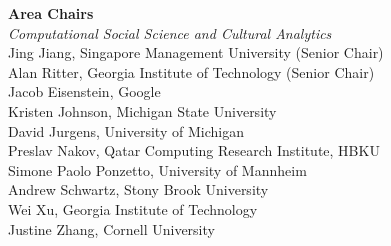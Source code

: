 {\bf Area Chairs} \\
\emph{Computational Social Science and Cultural Analytics} \\
\hspace*{0.2in} Jing Jiang, Singapore Management University (Senior Chair)\\
\hspace*{0.2in} Alan Ritter, Georgia Institute of Technology (Senior Chair)\\
\hspace*{0.2in} Jacob Eisenstein, Google\\
\hspace*{0.2in} Kristen Johnson, Michigan State University\\
\hspace*{0.2in} David Jurgens, University of Michigan\\
\hspace*{0.2in} Preslav Nakov, Qatar Computing Research Institute, HBKU\\
\hspace*{0.2in} Simone Paolo Ponzetto, University of Mannheim\\
\hspace*{0.2in} Andrew Schwartz, Stony Brook University\\
\hspace*{0.2in} Wei Xu, Georgia Institute of Technology\\
\hspace*{0.2in} Justine Zhang, Cornell University\\

